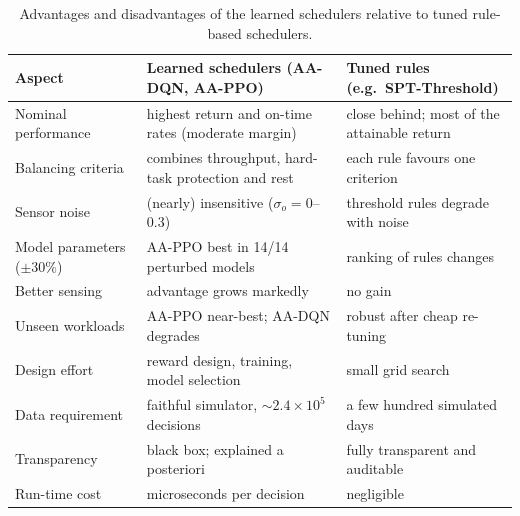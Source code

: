 {\begin{table}[!htbp]
\centering
\caption{Advantages and disadvantages of the learned schedulers relative to tuned rule-based schedulers.}
\label{tab:procons}
\small
\begin{tabular}{p{2.3cm}p{4.9cm}p{4.9cm}}
\toprule
Aspect & Learned schedulers (AA-DQN, AA-PPO) & Tuned rules (e.g.\ SPT-Threshold) \\
\midrule
Nominal performance & highest return and on-time rates (moderate margin) & close behind; most of the attainable return \\
Balancing criteria & combines throughput, hard-task protection and rest & each rule favours one criterion \\
Sensor noise & (nearly) insensitive ($\sigma_o=0$--$0.3$) & threshold rules degrade with noise \\
Model parameters ($\pm30\%$) & AA-PPO best in 14/14 perturbed models & ranking of rules changes \\
Better sensing & advantage grows markedly & no gain \\
Unseen workloads & AA-PPO near-best; AA-DQN degrades & robust after cheap re-tuning \\
Design effort & reward design, training, model selection & small grid search \\
Data requirement & faithful simulator, $\sim\!2.4\times10^5$ decisions & a few hundred simulated days \\
Transparency & black box; explained a posteriori & fully transparent and auditable \\
Run-time cost & microseconds per decision & negligible \\
\bottomrule
\end{tabular}
\end{table}
}

